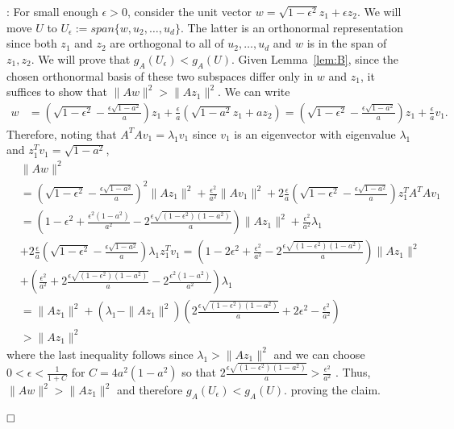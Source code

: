 \documentclass{article}
\newenvironment{proofof}[1]{\smallskip\noindent{\bf Proof of #1}:}{$\hfill \Box$\\}
\begin{document}
\begin{proofof}{Lemma~\ref{lem:C}}
For small enough  $\epsilon > 0$, consider the unit vector $w = \sqrt{1-\epsilon^2}z_1 + \epsilon z_2$. We will move $U$ to $U_\epsilon:=span \{w,u_2,\ldots,u_d\}$. The latter is an orthonormal representation since both $z_1$ and $z_2$ are orthogonal to all of $u_2, \ldots, u_d$  and $w$ is in the span of $z_1, z_2$. We will prove that $g_A(U_\epsilon) < g_A(U)$. Given Lemma~\ref{lem:B}, since the chosen orthonormal basis of these two subspaces differ only in $w$ and $z_1$, it suffices to show that $\|Aw\|^2 > \|Az_1\|^2$.
We can write
\begin{align*}
w &= \left(\sqrt{1-\epsilon^2} - \frac{\epsilon\sqrt{1-a^2}}{a}\right)z_1 +  \frac{\epsilon}{a}(\sqrt{1-a^2}z_1 + az_2 )=\left(\sqrt{1-\epsilon^2} - \frac{\epsilon\sqrt{1-a^2}}{a}\right)z_1 +  \frac{\epsilon}{a}v_1.
\end{align*}
Therefore, noting that $A^TAv_1 = \lambda_1 v_1$ since $v_1$ is an eigenvector with eigenvalue $\lambda_1$ and $z_1^Tv_1=\sqrt{1-a^2}$,
\begin{align*}
&\|Aw\|^2 \\
&= \left( \sqrt{1-\epsilon^2} - \frac{\epsilon\sqrt{1-a^2}}{a} \right)^2\|Az_1\|^2 + \frac{\epsilon^2}{a^2} \|Av_1\|^2 + 2\frac{\epsilon}{a}\left(\sqrt{1-\epsilon^2} - \frac{\epsilon\sqrt{1-a^2}}{a}\right)z_1^TA^TAv_1\\
&=\left(1-\epsilon^2 + \frac{\epsilon^2(1-a^2)}{a^2}-2\frac{\epsilon\sqrt{(1-\epsilon^2)(1-a^2)}}{a}\right)\|Az_1\|^2 + \frac{\epsilon^2}{a^2}\lambda_1 \\
& + 2\frac{\epsilon}{a}\left(\sqrt{1-\epsilon^2} - \frac{\epsilon\sqrt{1-a^2}}{a}\right)\lambda_1 z_1^Tv_1
=\left(1-2\epsilon^2 + \frac{\epsilon^2}{a^2}-2\frac{\epsilon\sqrt{(1-\epsilon^2)(1-a^2)}}{a}\right)\|Az_1\|^2 \\
&+ \left(\frac{\epsilon^2}{a^2} + 2\frac{\epsilon\sqrt{(1-\epsilon^2)(1-a^2)}}{a} - 2\frac{\epsilon^2(1-a^2)}{a^2}\right)\lambda_1 \\
&=\|Az_1\|^2 + (\lambda_1-\|Az_1\|^2)\left(2\frac{\epsilon\sqrt{(1-\epsilon^2)(1-a^2)}}{a}+2\epsilon^2 - \frac{\epsilon^2}{a^2}\right)\\
&>\|Az_1\|^2
\end{align*}
where the last inequality follows since $\lambda_1 > \|Az_1\|^2$ and we can choose $ 0 < \epsilon < \frac{1}{1+C}$ for $C= 4a^2(1-a^2)$ so that $ 2\frac{\epsilon\sqrt{(1-\epsilon^2)(1-a^2)}}{a} > \frac{\epsilon^2}{a^2}$ .
Thus, $\|Aw\|^2 > \|Az_1\|^2$ and therefore $g_A(U_\epsilon) < g_A(U)$.
proving the claim.

\end{proofof}
\end{document}
